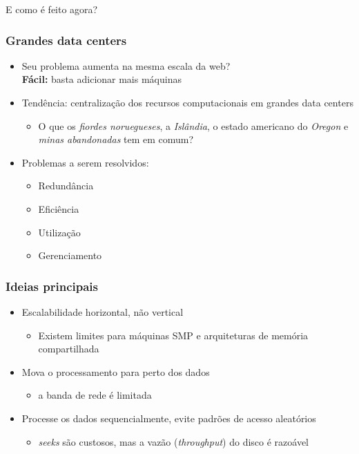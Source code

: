 \documentclass[Ligatures=TeX,table,brazil,svgnames,usetotalslideindicator,comp
ress,10pt]{beamer}
\begin{document}
\begin{frame}
  \Huge E como é feito agora?
\end{frame}

\begin{frame}
  \frametitle{Grandes data centers}

  \begin{itemize}[<+->]
  \item Seu problema aumenta na mesma escala da web?\\\textbf{Fácil:} basta adicionar mais máquinas
  \item Tendência: centralização dos recursos computacionais em
    grandes data centers
    \begin{itemize}
    \item O que os \emph{fiordes noruegueses}, a \emph{Islândia}, o estado americano
      do \emph{Oregon} e \emph{minas abandonadas} tem em comum?
    \end{itemize}
  \item Problemas a serem resolvidos:
    \begin{itemize}
    \item Redundância
    \item Eficiência
    \item Utilização
    \item Gerenciamento
    \end{itemize}
  \end{itemize}

\end{frame}

\begin{frame}
  \frametitle{Ideias principais}

  \begin{itemize}
  \item Escalabilidade horizontal, não vertical
    \begin{itemize}
    \item Existem limites para máquinas SMP e arquiteturas de memória compartilhada
    \end{itemize}
  \item Mova o processamento para perto dos dados
    \begin{itemize}
    \item a banda de rede é limitada
    \end{itemize}
  \item Processe os dados sequencialmente, evite padrões de acesso
    aleatórios
    \begin{itemize}
    \item \textit{seeks} são custosos, mas a vazão
      (\textit{throughput}) do disco é razoável
    \end{itemize}
  \end{itemize}

\end{frame}
\end{document}
